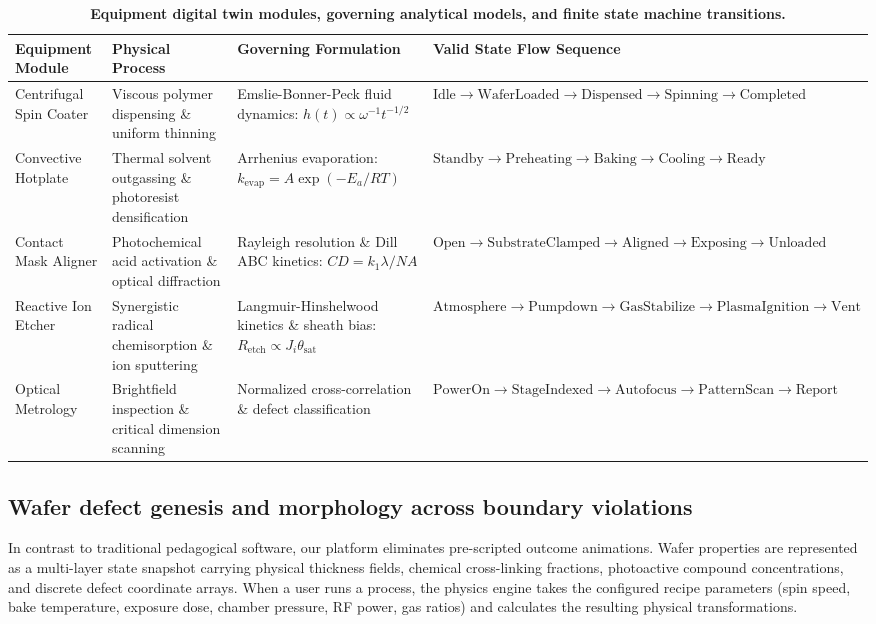 \documentclass[10pt,a4paper,twocolumn]{article}
\begin{document}
\begin{table}[!t]
\centering
\caption{\textbf{Equipment digital twin modules, governing analytical models, and finite state machine transitions.}}
\label{table:equipment_fsm}
\small
\begin{tabularx}{\textwidth}{p{3.2cm}p{3.8cm}p{4.2cm}X}
\toprule
\textbf{Equipment Module} & \textbf{Physical Process} & \textbf{Governing Formulation} & \textbf{Valid State Flow Sequence} \\
\midrule
Centrifugal Spin Coater & Viscous polymer dispensing \& uniform thinning & Emslie-Bonner-Peck fluid dynamics: $h(t) \propto \omega^{-1} t^{-1/2}$ & $\text{Idle} \rightarrow \text{WaferLoaded} \rightarrow \text{Dispensed} \rightarrow \text{Spinning} \rightarrow \text{Completed}$ \\
Convective Hotplate & Thermal solvent outgassing \& photoresist densification & Arrhenius evaporation: $k_{\text{evap}} = A \exp(-E_a / R T)$ & $\text{Standby} \rightarrow \text{Preheating} \rightarrow \text{Baking} \rightarrow \text{Cooling} \rightarrow \text{Ready}$ \\
Contact Mask Aligner & Photochemical acid activation \& optical diffraction & Rayleigh resolution \& Dill ABC kinetics: $CD = k_1 \lambda / NA$ & $\text{Open} \rightarrow \text{SubstrateClamped} \rightarrow \text{Aligned} \rightarrow \text{Exposing} \rightarrow \text{Unloaded}$ \\
Reactive Ion Etcher & Synergistic radical chemisorption \& ion sputtering & Langmuir-Hinshelwood kinetics \& sheath bias: $R_{\text{etch}} \propto J_i \theta_{\text{sat}}$ & $\text{Atmosphere} \rightarrow \text{Pumpdown} \rightarrow \text{GasStabilize} \rightarrow \text{PlasmaIgnition} \rightarrow \text{Vent}$ \\
Optical Metrology & Brightfield inspection \& critical dimension scanning & Normalized cross-correlation \& defect classification & $\text{PowerOn} \rightarrow \text{StageIndexed} \rightarrow \text{Autofocus} \rightarrow \text{PatternScan} \rightarrow \text{Report}$ \\
\bottomrule
\end{tabularx}
\end{table}

\subsection*{Wafer defect genesis and morphology across boundary violations}
In contrast to traditional pedagogical software, our platform eliminates pre-scripted outcome animations. Wafer properties are represented as a multi-layer state snapshot carrying physical thickness fields, chemical cross-linking fractions, photoactive compound concentrations, and discrete defect coordinate arrays. When a user runs a process, the physics engine takes the configured recipe parameters (spin speed, bake temperature, exposure dose, chamber pressure, RF power, gas ratios) and calculates the resulting physical transformations.
\end{document}
